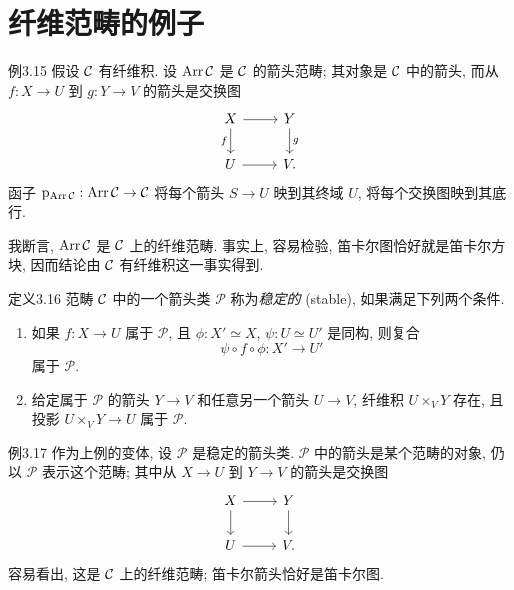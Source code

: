 \section{纤维范畴的例子}
\label{ch03:sec32}
\begin{origstatement}{例}{3.15}\label{ch03:ex315}
假设 $\mathcal C$ 有纤维积. 设 $\operatorname{Arr}\mathcal C$ 是 $\mathcal C$ 的箭头范畴; 其对象是 $\mathcal C$ 中的箭头, 而从 $f:X\to U$ 到 $g:Y\to V$ 的箭头是交换图
\[
\begin{tikzcd}
X\arrow[r]\arrow[d,"{f}"']&Y\arrow[d,"{g}"]\\
U\arrow[r]&V.
\end{tikzcd}
\]
函子 $\mathrm p_{\operatorname{Arr}\mathcal C}:\operatorname{Arr}\mathcal C\to\mathcal C$ 将每个箭头 $S\to U$ 映到其终域 $U$, 将每个交换图映到其底行.

我断言, $\operatorname{Arr}\mathcal C$ 是 $\mathcal C$ 上的纤维范畴. 事实上, 容易检验, 笛卡尔图恰好就是笛卡尔方块, 因而结论由 $\mathcal C$ 有纤维积这一事实得到.
\end{origstatement}

\begin{origstatement}{定义}{3.16}\label{ch03:def316}
范畴 $\mathcal C$ 中的一个箭头类 $\mathcal P$ 称为\emph{稳定的} (stable), 如果满足下列两个条件.
\begin{enumerate}
\item[(a)] 如果 $f:X\to U$ 属于 $\mathcal P$, 且 $\phi:X'\simeq X$, $\psi:U\simeq U'$ 是同构, 则复合
\[
\psi\circ f\circ\phi:X'\longrightarrow U'
\]
属于 $\mathcal P$.
\item[(b)] 给定属于 $\mathcal P$ 的箭头 $Y\to V$ 和任意另一个箭头 $U\to V$, 纤维积 $U\times_VY$ 存在, 且投影 $U\times_VY\to U$ 属于 $\mathcal P$.
\end{enumerate}
\end{origstatement}

\begin{origstatement}{例}{3.17}\label{ch03:ex317}
作为上例的变体, 设 $\mathcal P$ 是稳定的箭头类. $\mathcal P$ 中的箭头是某个范畴的对象, 仍以 $\mathcal P$ 表示这个范畴; 其中从 $X\to U$ 到 $Y\to V$ 的箭头是交换图
\[
\begin{tikzcd}
X\arrow[r]\arrow[d]&Y\arrow[d]\\
U\arrow[r]&V.
\end{tikzcd}
\]
容易看出, 这是 $\mathcal C$ 上的纤维范畴; 笛卡尔箭头恰好是笛卡尔图.
\end{origstatement}

